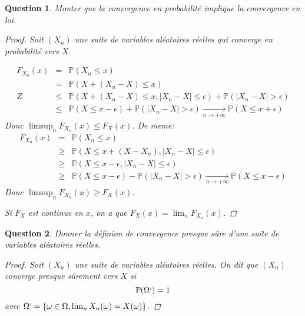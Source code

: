 \documentclass{article}
\theoremstyle{plain}
\newtheorem{question}{Question}
\begin{document}
\begin{question}
	Monter que la convergence en probabilité implique la convergence en loi.
	\begin{proof}
		Soit $(X_n)$ une suite de variables aléatoires réelles qui converge en probabilité vers $X$.

		\begin{eqnarray*}
			F_{X_n} (x) &=& \mathbb{P} (X_n \leq x) \\
			&=& \mathbb{P} (X + (X_n - X) \leq x) \\Z
			&\leq& \mathbb{P} (X+(X_n-X) \leq x, |X_n - X| \leq \epsilon) + \mathbb{P} (|X_n - X| > \epsilon) \\
			&\leq& \mathbb{P} (X \leq x - \epsilon) + \mathbb{P} (|X_n - X| > \epsilon) \underset{n\to +\infty}{\longrightarrow} \mathbb{P}(X \leq x + \epsilon)
		\end{eqnarray*}
		Donc $\limsup_n F_{X_n} (x) \leq F_X(x)$.
		De meme:
		\begin{eqnarray*}
			F_{X_n} (x) &=& \mathbb{P} (X_n \leq x) \\
			&\geq& \mathbb{P} (X \leq x + (X-X_n), |X_n - X| \leq \epsilon) \\
			&\geq& \mathbb{P} (X \leq x - \epsilon, |X_n - X| \leq \epsilon) \\
			&\geq& \mathbb{P} (X \leq x - \epsilon) - \mathbb{P} (|X_n - X| > \epsilon)  \underset{n\to +\infty}{\longrightarrow} \mathbb{P}(X \leq x - \epsilon)
		\end{eqnarray*}
		Donc $\limsup_n F_{X_n} (x) \geq F_X(x)$.

		Si $F_X$ est continue en $x$, on a que $F_X(x) = \lim_n F_{X_n} (x)$.
	\end{proof}
\end{question}

\begin{question}
	Donner la définion de convergence presque sûre d'une suite de variables aléatoires réelles.
	\begin{proof}
		Soit $(X_n)$ une suite de variables aléatoires réelles. On dit que $(X_n)$ converge presque sûrement vers $X$ si
		\begin{equation*}
			\mathbb{P} (\Omega`) = 1
		\end{equation*}
		avec $\Omega` = \{\omega \in \Omega, \lim_n X_n (\omega) = X(\omega)\}$.
	\end{proof}
\end{question}
\end{document}
